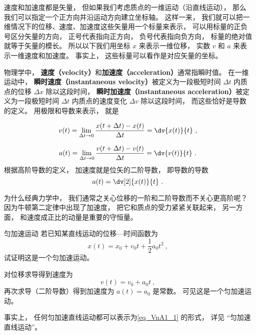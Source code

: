 

速度和加速度都是矢量， 但如果我们考虑质点的一维运动（沿直线运动）， 那么我们可以指定一个正方向并沿运动方向建立坐标轴。 这样一来， 我们就可以把一维情况下的位移、速度、加速度这些矢量用一个标量来表示， 可以用标量的正负号区分矢量的方向， 正号代表指向正方向， 负号代表指向负方向， 标量的绝对值就等于矢量的模长。 所以以下我们用坐标 $x$ 来表示一维位移， 实数 $v$ 和 $a$ 来表示一维速度和加速度。 事实上， 这些标量可以看作是对应矢量的坐标。

物理学中， \textbf{速度（velocity）}和\textbf{加速度（acceleration）}通常指瞬时值。 在一维运动中， \textbf{瞬时速度（instantaneous velocity）}被定义为一段极短时间 $\Delta t$ 内质点的位移 $\Delta x$ 除以这段时间， \textbf{瞬时加速度（instantaneous acceleration）}被定义为一段极短时间 $\Delta t$ 内质点的速度变化 $\Delta v$ 除以这段时间， 而这些恰好是导数的定义。 用极限和导数来表示， 就是

\begin{equation}
v(t) = \lim_{\Delta t\to 0} \frac{x(t+\Delta t) - x(t)}{\Delta t} = \dv{x(t)}{t}~,
\end{equation}

\begin{equation}
a(t) = \lim_{\Delta t\to 0} \frac{v(t+\Delta t) - v(t)}{\Delta t} = \dv{v(t)}{t}~.
\end{equation}
根据高阶导数的定义， 加速度就是位矢的二阶导数， 即导数的导数
\begin{equation}
a(t) = \dv[2]{x(t)}{t}~.
\end{equation}

为什么经典力学中， 我们通常之关心位移的一阶和二阶导数而不关心更高阶呢？ 因为牛顿第二定律中出现了加速度， 把它和质点的受力紧紧关联起来， 另一方面， 和速度成正比的动量是重要的守恒量。

\begin{example}{匀加速运动}\label{ex_VnA1_1}
若已知某直线运动的位移—时间函数为
\begin{equation}\label{eq_VnA1_1}
x(t) = x_0 + v_0 t + \frac{1}{2} a_0 t^2~,
\end{equation}
试证明这是一个匀加速运动。

对位移求导得到速度为
\begin{equation}
v(t) = v_0 + a_0 t~,
\end{equation}
再次求导（二阶导数）得到加速度为 $a(t) = a_0$ 是常数。 可见这是一个匀加速运动。
\end{example}
事实上， 任何匀加速直线运动都可以表示为\autoref{eq_VnA1_1} 的形式， 详见 “匀加速直线运动”。

